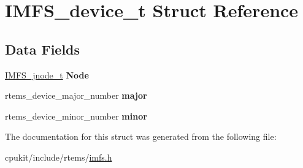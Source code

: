 \hypertarget{structIMFS__device__t}{}\section{I\+M\+F\+S\+\_\+device\+\_\+t Struct Reference}
\label{structIMFS__device__t}
\subsection*{Data Fields}
\begin{DoxyCompactItemize}
\item 
\mbox{\label{structIMFS__device__t_a80ce5a25e21879a7d0a6f6a0a5f1dbcc}} 
\mbox{\hyperlink{structIMFS__jnode__tt}{I\+M\+F\+S\+\_\+jnode\+\_\+t}} {\bfseries Node}
\item 
\mbox{\label{structIMFS__device__t_aa2b09c0b6ce0f219c9097f728ea39d5e}} 
rtems\+\_\+device\+\_\+major\+\_\+number {\bfseries major}
\item 
\mbox{\label{structIMFS__device__t_ac005910022921677edae443a94dc5277}} 
rtems\+\_\+device\+\_\+minor\+\_\+number {\bfseries minor}
\end{DoxyCompactItemize}


The documentation for this struct was generated from the following file\+:\begin{DoxyCompactItemize}
\item 
cpukit/include/rtems/\mbox{\hyperlink{imfs_8h}{imfs.\+h}}\end{DoxyCompactItemize}
